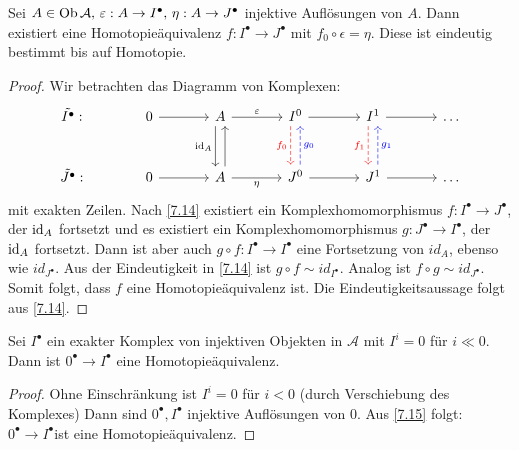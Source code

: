 \begin{fo}\label{7.15}
	Sei $A \in \text{Ob}\,\mathcal{A}, \,\varepsilon: A \to I^{\bullet}, \,\eta: A \to J^{\bullet}$ injektive Auflösungen von $A$. Dann existiert eine Homotopieäquivalenz $f:I^{\bullet} \to J^{\bullet} $ mit $ f_0 \circ \epsilon = \eta$. Diese ist eindeutig bestimmt bis auf Homotopie.
\end{fo}
\begin{proof}
	Wir betrachten das Diagramm von Komplexen: \\
	$$\begin{tikzcd}[column sep = large, row sep = large]
	\tilde{I^{\bullet}}: &0 \arrow{r} & A \arrow[xshift= -0.8 ex, swap]{d}{\id_A} \arrow{r}{\epsilon}& I^0 \arrow[dashed,red, swap, xshift= -0.8 ex]{d}{f_0}\arrow{r} & I^1 \arrow[dashed,red,xshift= -0.8 ex, swap ]{d}{f_1} \arrow{r} & \ldots\\
	\tilde{J^{\bullet}}:& 0 \arrow{r} & A \arrow[xshift=0.8 ex]{u}\arrow[swap]{r}{\eta} & J^0 \arrow[dashed, blue, xshift = 0.8 ex, swap]{u}{g_0} \arrow[swap]{r} & J^1 \arrow[dashed, blue, swap, xshift=0.8 ex]{u}{g_1} \arrow{r} & \ldots
	\end{tikzcd}$$
	mit exakten Zeilen. Nach \ref{7.14} existiert ein Komplexhomomorphismus $ f: I^{\bullet} \to J^{\bullet} $, der $\operatorname{id}_A $ fortsetzt und es existiert ein Komplexhomomorphismus $g: J^{\bullet} \to I^{\bullet}$, der $\operatorname{id}_A $ fortsetzt. Dann ist aber auch $g \circ f: I^{\bullet} \to I^{\bullet} $ eine Fortsetzung von $id_A$, ebenso wie $id_{J^{\bullet}}$. Aus der Eindeutigkeit in \ref{7.14} ist $ g \circ f \sim id_{I^{\bullet}}.$ Analog ist $f \circ g \sim id_{J^{\bullet}}.$ Somit folgt, dass $f$ eine Homotopieäquivalenz ist. Die Eindeutigkeitsaussage folgt aus \ref{7.14}.
\end{proof}
\begin{fo}
	Sei $I^{\bullet} $ ein exakter Komplex von injektiven Objekten in $\mathcal{A} $ mit $ I^i = 0 $ für $ i \ll 0$. Dann ist $0^{\bullet} \to I^{\bullet} $ eine Homotopieäquivalenz. 
\end{fo}
\begin{proof}
	Ohne Einschränkung ist $ I^i = 0 $ für $ i < 0 $ (durch Verschiebung des Komplexes) Dann sind $ 0^{\bullet}, I^{\bullet} $ injektive Auflösungen von 0. Aus \ref{7.15} folgt: $0^{\bullet} \to I^{\bullet} $ist eine Homotopieäquivalenz.
\end{proof} 
\newpage
